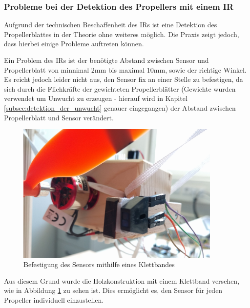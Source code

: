 
\subsubsection*{Probleme bei der Detektion des Propellers mit einem \ac{IR}}
Aufgrund der technischen Beschaffenheit des \ac{IR}s ist eine Detektion des Propellerblattes in der Theorie ohne weiteres möglich.
Die Praxis zeigt jedoch, dass hierbei einige Probleme auftreten können.

Ein Problem des \ac{IR}s ist der benötigte Abstand zwischen Sensor und Propellerblatt von minnimal 2mm bis maximal 10mm, sowie der richtige Winkel.
Es reicht jedoch leider nicht aus, den Sensor fix an einer Stelle zu befestigen, da sich durch die Fliehkräfte der gewichteten Propellerblätter (Gewichte wurden verwendet um Unwucht zu erzeugen - hierauf wird in Kapitel \ref{subsec:detektion_der_unwucht} genauer eingegangen) der Abstand zwischen Propellerblatt und Sensor verändert.
\begin{figure}[H]
	\centering
	\includegraphics[width=0.9\textwidth]{images/chapter/03/exp_ir_sensor.jpg}
	\caption{Befestigung des Sensors mithilfe eines Klettbandes}
	\label{fig:exp_ir_sensor}
\end{figure}
Aus diesem Grund wurde die Holzkonstruktion mit einem Klettband versehen, wie in Abbildung \ref{fig:exp_ir_sensor} zu sehen ist.
Dies ermöglicht es, den Sensor für jeden Propeller individuell einzustellen.

